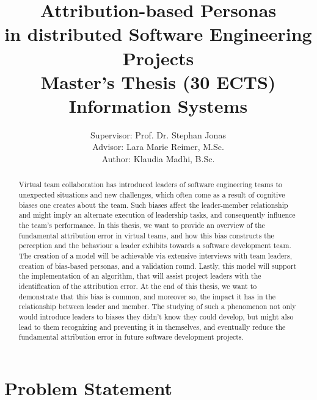 \documentclass[a4paper]{article}
\title{
Attribution-based Personas 
\\ in distributed Software Engineering Projects
\\
\vspace{.2 \baselineskip}
\small{Master's Thesis (30 ECTS)} \\
\small{Information Systems}}
\author{
Supervisor: Prof. Dr. Stephan Jonas\\
Advisor: Lara Marie Reimer, M.Sc.\\
Author: Klaudia Madhi, B.Sc.
}
\begin{document}
\maketitle

\begin{abstract}

Virtual team collaboration has introduced leaders of software engineering teams to unexpected situations and new challenges, which often come as a result of cognitive biases one creates about the team. Such biases affect the leader-member relationship and might imply an alternate execution of leadership tasks, and consequently influence the team's performance. In this thesis, we want to provide an overview of the fundamental attribution error in virtual teams, and how this bias constructs the perception and the behaviour a leader exhibits towards a software development team. The creation of a model will be achievable via extensive interviews with team leaders, creation of bias-based personas, and a validation round. Lastly, this model will support the implementation of an algorithm, that will assist project leaders with the identification of the attribution error. At the end of this thesis, we want to demonstrate that this bias is common, and moreover so, the impact it has in the relationship between leader and member. The studying of such a phenomenon not only would introduce leaders to biases they didn't know they could develop, but might also lead to them recognizing and preventing it in themselves, and eventually reduce the fundamental attribution error in future software development projects.

\end{abstract}


\newpage


\section{Problem Statement}
\end{document}
